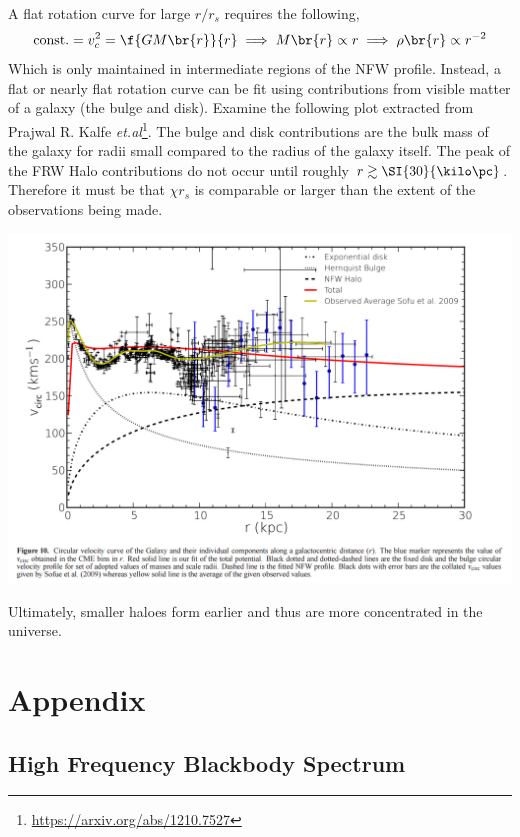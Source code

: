 \documentclass{article}
\begin{document}
A flat rotation curve for large $r/r_s$ requires the following,
\[ \text{const.} = v_c^{2} = \f{G M \br{r}}{r} \implies M\br{r} \propto r \implies \rho\br{r} \propto r^{-2} \]
Which is only maintained in intermediate regions of the NFW profile. Instead, a flat or nearly flat rotation curve can be fit using contributions from visible matter of a galaxy (the bulge and disk). Examine the following plot extracted from Prajwal R. Kalfe \textit{et.al}\footnote{\url{https://arxiv.org/abs/1210.7527}}. The bulge and disk contributions are the bulk mass of the galaxy for radii small compared to the radius of the galaxy itself. The peak of the FRW Halo contributions do not occur until roughly $r \gtrsim \SI{30}{\kilo\pc}$. Therefore it must be that $\chi r_s$ is comparable or larger than the extent of the observations being made.
\begin{center}
    \includegraphics[width=\textwidth]{figures/curve_extract.png}
\end{center}

Ultimately, smaller haloes form earlier and thus are more concentrated in the universe.

\newpage
\section*{Appendix}
\setcounter{subsection}{0}
\setcounter{subsubsection}{0}
\renewcommand*{\theHsubsection}{appendix.\the\value{subsection}}
\renewcommand{\thesubsection}{\Alph{subsection}}
\subsection{High Frequency Blackbody Spectrum}
\label{sec:upper_black_body}
\end{document}
